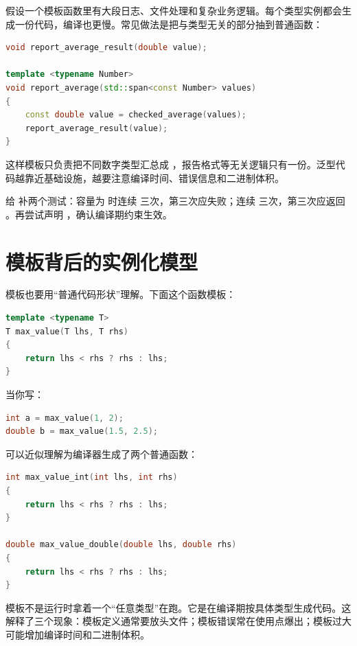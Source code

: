 假设一个模板函数里有大段日志、文件处理和复杂业务逻辑。每个类型实例都会生成一份代码，编译也更慢。常见做法是把与类型无关的部分抽到普通函数：

\begin{lstlisting}[language=C++,caption={模板层只做类型相关转换}]
void report_average_result(double value);

template <typename Number>
void report_average(std::span<const Number> values)
{
    const double value = checked_average(values);
    report_average_result(value);
}
\end{lstlisting}

这样模板只负责把不同数字类型汇总成 ，报告格式等无关逻辑只有一份。泛型代码越靠近基础设施，越要注意编译时间、错误信息和二进制体积。

\begin{exercisebox}
给  补两个测试：容量为  时连续  三次，第三次应失败；连续  三次，第三次应返回 。再尝试声明 ，确认编译期约束生效。
\end{exercisebox}

\section{模板背后的实例化模型}

模板也要用“普通代码形状”理解。下面这个函数模板：

\begin{lstlisting}[language=C++,caption={函数模板}]
template <typename T>
T max_value(T lhs, T rhs)
{
    return lhs < rhs ? rhs : lhs;
}
\end{lstlisting}

当你写：

\begin{lstlisting}[language=C++,caption={两个调用点}]
int a = max_value(1, 2);
double b = max_value(1.5, 2.5);
\end{lstlisting}

可以近似理解为编译器生成了两个普通函数：

\begin{lstlisting}[language=C++,caption={近似生成的普通函数}]
int max_value_int(int lhs, int rhs)
{
    return lhs < rhs ? rhs : lhs;
}

double max_value_double(double lhs, double rhs)
{
    return lhs < rhs ? rhs : lhs;
}
\end{lstlisting}

模板不是运行时拿着一个“任意类型”在跑。它是在编译期按具体类型生成代码。这解释了三个现象：模板定义通常要放头文件；模板错误常在使用点爆出；模板过大可能增加编译时间和二进制体积。

